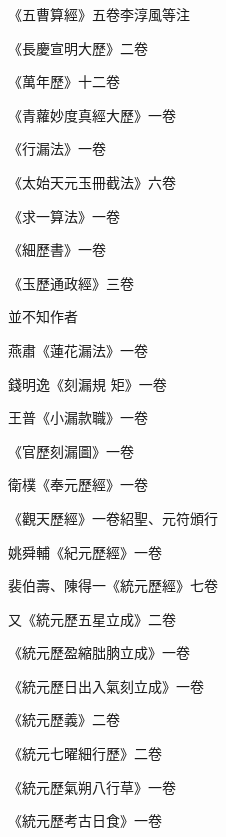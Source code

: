 \begin{pinyinscope}
 《五曹算經》五卷李淳風等注



 《長慶宣明大歷》二卷



 《萬年歷》十二卷



 《青蘿妙度真經大歷》一卷



 《行漏法》一卷



 《太始天元玉冊截法》六卷



 《求一算法》一卷



 《細歷書》一卷



 《玉歷通政經》三卷



 並不知作者



 燕肅《蓮花漏法》一卷



 錢明逸《刻漏規
 矩》一卷



 王普《小漏款職》一卷



 《官歷刻漏圖》一卷



 衛樸《奉元歷經》一卷



 《觀天歷經》一卷紹聖、元符頒行



 姚舜輔《紀元歷經》一卷



 裴伯壽、陳得一《統元歷經》七卷



 又《統元歷五星立成》二卷



 《統元歷盈縮朏朒立成》一卷



 《統元歷日出入氣刻立成》一卷



 《統元歷義》二卷



 《統元七曜細行歷》二卷



 《統元歷氣朔八行草》一卷



 《統元歷考古日食》一卷




\end{pinyinscope}
